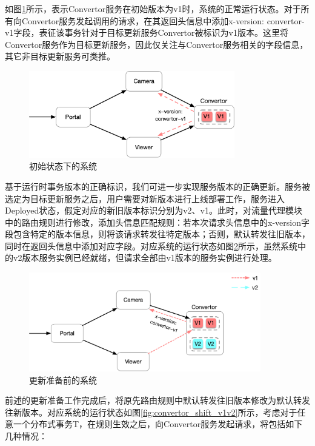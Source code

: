 \documentclass[macfonts,master]{njuthesis}
\begin{document}
如图\ref{fig:convertor_normal_v1}所示，表示Convertor服务在初始版本为v1时，系统的正常运行状态。对于所有向Convertor服务发起调用的请求，在其返回头信息中添加x-version: convertor-v1字段，表征该事务针对于目标更新服务Convertor被标识为v1版本。这里将Convertor服务作为目标更新服务，因此仅关注与Convertor服务相关的字段信息，其它非目标更新服务可类推。

\begin{figure}[!htbp]
  \centering
  \includegraphics[width= 0.8\textwidth]{image/convertor_normal_v1.png}
  \caption{初始状态下的系统}
  \label{fig:convertor_normal_v1}
\end{figure}

基于运行时事务版本的正确标识，我们可进一步实现服务版本的正确更新。服务被选定为目标更新服务之后，用户需要对新版本进行上线部署工作，服务进入Deployed状态，假定对应的新旧版本标识分别为v2、v1。此时，对流量代理模块中的路由规则进行修改，添加头信息匹配规则：若本次请求头信息中的x-version字段包含特定的版本信息，则将该请求转发往特定版本；否则，默认转发往旧版本，同时在返回头信息中添加对应字段。对应系统的运行状态如图\ref{fig:convertor_prepared_v1v2}所示，虽然系统中的v2版本服务实例已经就绪，但请求全部由v1版本的服务实例进行处理。

\begin{figure}[!htbp]
  \centering
  \includegraphics[width= 0.9\textwidth]{image/convertor_prepared_v1v2.png}
  \caption{更新准备前的系统}
  \label{fig:convertor_prepared_v1v2}
\end{figure}

前述的更新准备工作完成后，将原先路由规则中默认转发往旧版本修改为默认转发往新版本。对应系统的运行状态如图\ref{fig:convertor_shift_v1v2}所示，考虑对于任意一个分布式事务T，在规则生效之后，向Convertor服务发起请求，将包括如下几种情况：
\end{document}
